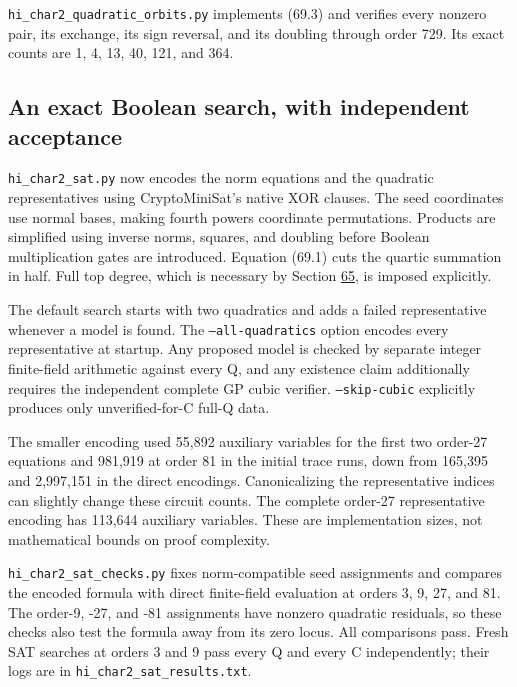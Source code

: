 \documentclass[11pt,reqno]{amsart}
\theoremstyle{plain}
\begin{document}
\texttt{hi\_\allowbreak char2\_\allowbreak quadratic\_\allowbreak orbits.py} implements (69.3) and verifies every
nonzero pair, its exchange, its sign reversal, and its doubling
through order 729. Its exact counts are 1, 4, 13, 40, 121, and 364.

\subsection{An exact Boolean search, with independent acceptance}\label{sec:69.3}

\texttt{hi\_\allowbreak char2\_\allowbreak sat.py} now encodes the norm equations and the quadratic
representatives using CryptoMiniSat's native XOR clauses. The seed
coordinates use normal bases, making fourth powers coordinate
permutations. Products are simplified using inverse norms, squares,
and doubling before Boolean multiplication gates are introduced.
Equation (69.1) cuts the quartic summation in half. Full top degree,
which is necessary by Section \hyperref[sec:65]{65}, is imposed explicitly.

The default search starts with two quadratics and adds a failed
representative whenever a model is found. The \texttt{--all-quadratics}
option encodes every representative at startup. Any proposed model
is checked by separate integer finite-field arithmetic against every
Q, and any existence claim additionally requires the independent
complete GP cubic verifier. \texttt{--skip-cubic} explicitly produces only
unverified-for-C full-Q data.

The smaller encoding used 55,892 auxiliary variables for the first
two order-27 equations and 981,919 at order 81 in the initial trace
runs, down from 165,395 and 2,997,151 in the direct encodings.
Canonicalizing the representative indices can slightly change these
circuit counts. The complete order-27 representative encoding has
113,644 auxiliary variables. These are implementation sizes, not
mathematical bounds on proof complexity.

\texttt{hi\_\allowbreak char2\_\allowbreak sat\_\allowbreak checks.py} fixes norm-compatible seed assignments and
compares the encoded formula with direct finite-field evaluation at
orders 3, 9, 27, and 81. The order-9, -27, and -81 assignments have
nonzero quadratic residuals, so these checks also test the formula
away from its zero locus. All comparisons pass. Fresh SAT searches
at orders 3 and 9 pass every Q and every C independently; their logs
are in \texttt{hi\_\allowbreak char2\_\allowbreak sat\_\allowbreak results.txt}.
\end{document}
